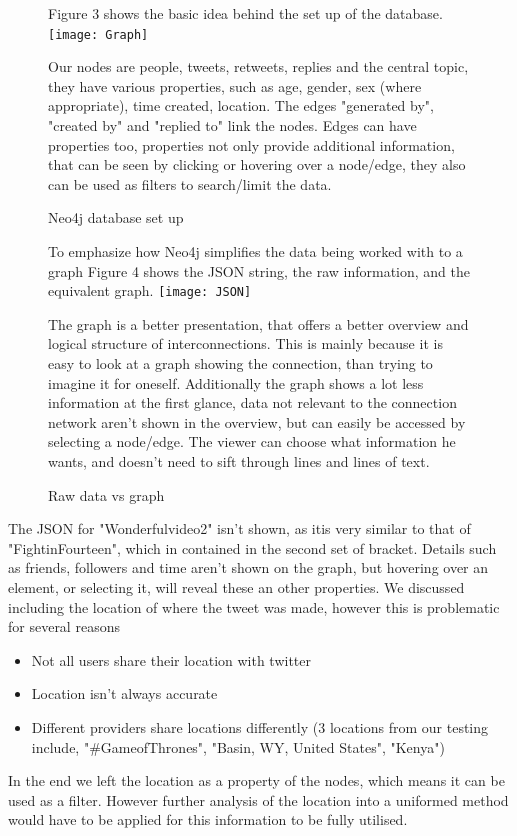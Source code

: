 \documentclass[11pt]{article}
\begin{document}
\begin{figure}
Figure 3 shows the basic idea behind the set up of the database.\newline
\texttt{[image: Graph]}\newline
\caption{Neo4j database set up} 
\label{fig: 3}
Our nodes are people, tweets, retweets, replies and the central topic, they have various properties, such as age, gender, sex (where appropriate), time created, location.
The edges "generated by", "created by" and "replied to" link the nodes. Edges can have properties too, properties not only provide additional information, that can be seen by clicking or hovering over a node/edge, they also can be used as filters to search/limit the data.
\end{figure}

\begin{figure}
To emphasize how Neo4j simplifies the data being worked with to a graph Figure 4 shows the JSON string, the raw information, and the equivalent graph.\newline
\texttt{[image: JSON]}\newline
\caption{Raw data vs graph} 
\label{fig: 4}
The graph is a better presentation, that offers a better overview and logical structure of interconnections. This is mainly because it is easy to look at a graph showing the connection, than trying to imagine it for oneself.\newline
Additionally the graph shows a lot less information at the first glance, data not relevant to the connection network aren't shown in the overview, but can easily be accessed by selecting a node/edge. The viewer can choose what information he wants, and doesn't need to sift through lines and lines of text.
\end{figure}

The JSON for "Wonderfulvideo2" isn't shown, as itis very similar to that of "FightinFourteen", which in contained in the second set of bracket{}.
Details such as friends, followers and time aren't shown on the graph, but hovering over an element, or selecting it, will reveal these an other properties.
\newline
We discussed including the location of where the tweet was made, however this is problematic for several reasons
\begin{itemize}
\item Not all users share their location with twitter
\item Location isn't always accurate
\item Different providers share locations differently (3 locations from our testing include, "\#GameofThrones", "Basin, WY, United States", "Kenya")
\end{itemize}
In the end we left the location as a property of the nodes, which means it can be used as a filter. However further analysis of the location into a uniformed method would have to be applied for this information to be fully utilised.\newline
\end{document}
